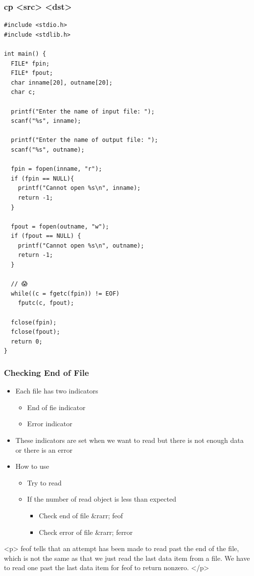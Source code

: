 \documentclass{../c-lecture}
\begin{document}
\begin{frame}
  \frametitle{cp <src> <dst>}
  \begin{verbatim}
#include <stdio.h>
#include <stdlib.h>

int main() {
  FILE* fpin;
  FILE* fpout;
  char inname[20], outname[20];
  char c;

  printf("Enter the name of input file: ");
  scanf("%s", inname);

  printf("Enter the name of output file: ");
  scanf("%s", outname);

  fpin = fopen(inname, "r");
  if (fpin == NULL){
    printf("Cannot open %s\n", inname);
    return -1;
  }

  fpout = fopen(outname, "w");
  if (fpout == NULL) {
    printf("Cannot open %s\n", outname);
    return -1;
  }

  // 😱
  while((c = fgetc(fpin)) != EOF)
    fputc(c, fpout);

  fclose(fpin);
  fclose(fpout);
  return 0;
}
  \end{verbatim}
\end{frame}
\begin{frame}
  \begin{frame}
    \frametitle{Checking End of File}
    \begin{itemize}
      \item Each file has two indicators
      \begin{itemize}
        \item End of fie indicator
        \item Error indicator
      \end{itemize}
      \item
        These indicators are set when we want to read but there is not enough
        data or there is an error

      \item How to use
      \begin{itemize}
        \item Try to read
        \item If the number of read object is less than expected
        \begin{itemize}
          \item Check end of file &rarr; feof
          \item Check error of file &rarr; ferror
        \end{itemize}
      \end{itemize}
    \end{itemize}
  \end{frame}
  \begin{frame}
    <p>
      feof tells that an attempt has been made to read past the end of the file,
      which is not the same as that we just read the last data item from a file.
      We have to read one past the last data item for feof to return nonzero.
    </p>
  \end{frame}
\end{frame}
\end{document}
